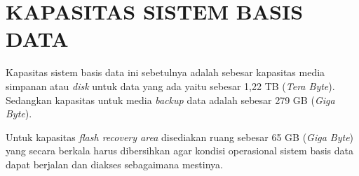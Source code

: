\chapter{KAPASITAS SISTEM BASIS DATA}

Kapasitas sistem basis data ini sebetulnya adalah sebesar kapasitas media simpanan atau \textit{disk} untuk data yang ada yaitu sebesar 1,22 TB (\textit{Tera Byte}). Sedangkan kapasitas untuk media \textit{backup} data adalah sebesar 279 GB (\textit{Giga Byte}).

Untuk kapasitas \textit{flash recovery area} disediakan ruang sebesar 65 GB (\textit{Giga Byte}) yang secara berkala harus dibersihkan agar kondisi operasional sistem basis data dapat berjalan dan diakses sebagaimana mestinya.